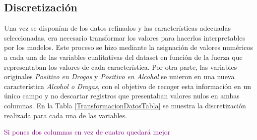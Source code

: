 \subsection*{Discretización}

Una vez se disponían de los datos refinados y las características adecuadas seleccionadas, era necesario transformar los valores para hacerlos interpretables por los modelos. Este proceso se hizo mediante la asignación de valores numéricos a cada una de las variables cualitativas del dataset en función de la fuerza que representaban los valores de cada característica. Por otra parte, las variables originales \textit{Positivo en Drogas} y \textit{Positivo en Alcohol} se unieron en una nueva característica \textit{Alcohol o Drogas}, con el objetivo de recoger esta información en un único campo y no descartar registros que presentaban valores nulos en ambas columnas. En la Tabla \ref{TransformacionDatosTabla} se muestra la discretización realizada para cada una de las variables.

\textcolor{purple}{Si pones dos columnas en vez de cuatro quedará mejor}

